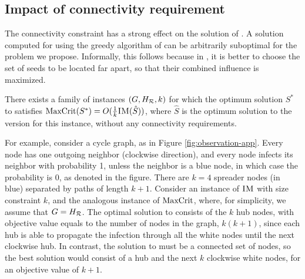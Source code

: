 \subsection{Impact of connectivity requirement}
The connectivity constraint has a strong effect on the solution of \maxcrit{}.
A solution computed for \infmax{} using the greedy algorithm of \cite{kempe:sigkdd03} can be arbitrarily suboptimal for the problem we propose. Informally, this follows because in \infmax{}, it is better to choose
the set of seeds to be located far apart, so that their combined influence is maximized.

\begin{observation}
There exists a family of instances $(G, H_{\mathcal{R}}, k)$ for which the optimum solution
$S^*$ to \maxcrit{} satisfies
$\text{MaxCrit}(S^*) =O(\frac{1}{k}\textsc{IM}(\hat{S}))$, where $\hat{S}$ is the optimum
solution to the \infmax{} version for this instance, without any connectivity requirements.
\end{observation}

For example, consider a cycle graph, as in Figure \ref{fig:observation-app}. Every node has one outgoing neighbor (clockwise direction), and every node infects its neighbor with probability 1, unless the neighbor is a blue node, in which case the probability is 0, as denoted in the figure. There are $k=4$ spreader nodes (in blue) separated by paths of length $k+1$. Consider an instance of $\textsc{IM}{}$ with size constraint $k$, and the analogous instance of $\text{MaxCrit}{}$, where, for simplicity, we assume that $G = H_{\mathcal{R}}$. The optimal solution to \infmax{} consists of the $k$ hub nodes, with objective value equals to the number of nodes in the graph, $k(k+1)$, since each hub is able to propagate the infection through all the white nodes until the next clockwise hub. In contrast, the solution to \maxcrit{} must be a connected set of nodes, so the best solution would consist of a hub and the next $k$ clockwise white nodes, for an objective value of $k + 1$.

